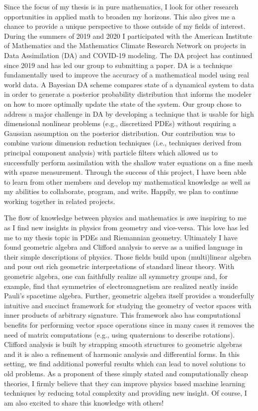 \documentclass{article}
\begin{document}
Since the focus of my thesis is in pure mathematics, I look for other research opportunities in applied math to broaden my horizons. This also gives me a chance to provide a unique perspective to those outside of my fields of interest. During the summers of 2019 and 2020 I participated with the American Institute of Mathematics and the Mathematics Climate Research Network on projects in Data Assimilation (DA) and COVID-19 modeling. The DA project has continued since 2019 and has led our group to submitting a paper. DA is a technique fundamentally used to improve the accuracy of a mathematical model using real world data. A Bayesian DA scheme compares state of a dynamical system to data in order to generate a posterior probability distribution that informs the modeler on how to more optimally update the state of the system. Our group chose to address a major challenge in DA by developing a technique that is usable for high dimensional nonlinear problems (e.g., discretized PDEs) without requiring a Gaussian assumption on the posterior distribution. Our contribution was to combine various dimension reduction techniques (i.e., techniques derived from principal component analysis) with particle filters which allowed us to successfully perform assimilation with the shallow water equations on a fine mesh with sparse measurement. Through the success of this project, I have been able to learn from other members and develop my mathematical knowledge as well as my abilities to collaborate, program, and write. Happily, we plan to continue working together in related projects.

The flow of knowledge between physics and mathematics is awe inspiring to me as I find new insights in physics from geometry and vice-versa. This love has led me to my thesis topic in PDEs and Riemannian geometry. Ultimately I have found geometric algebra and Clifford analysis to serve as a unified language in their simple descriptions of physics. Those fields build upon (multi)linear algebra and pour out rich geometric interpretations of standard linear theory.  With geometric algebra, one can faithfully realize all symmetry groups and, for example, find that symmetries of electromagnetism are realized neatly inside Pauli's spacetime algebra. Further, geometric algebra itself provides a wonderfully intuitive and succinct framework for studying the geometry of vector spaces with inner products of arbitrary signature. This framework also has computational benefits for performing vector space operations since in many cases it removes the need of matrix computations (e.g., using quaternions to describe rotations). Clifford analysis is built by strapping smooth structures to geometric algebras and it is also a refinement of harmonic analysis and differential forms. In this setting, we find additional powerful results which can lead to novel solutions to old problems. As a proponent of these simply stated and computationally cheap theories, I firmly believe that they can improve physics based machine learning techniques by reducing total complexity and providing new insight. Of course, I am also excited to share this knowledge with others!
\end{document}
